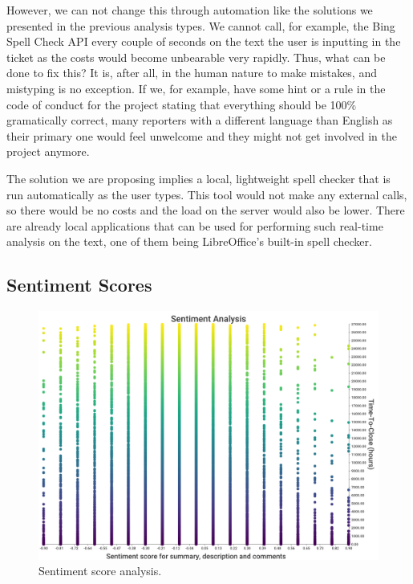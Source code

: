 \documentclass{mpaper}
\begin{document}
However, we can not change this through automation like the solutions we presented in the previous 
analysis types. We cannot call, for example, the Bing Spell Check API every couple of seconds on the text the user 
is inputting in the ticket as the costs would become unbearable very rapidly. Thus, what can be done to fix this? It is, 
after all, in the human nature to make mistakes, and mistyping is no exception. If we, for example, have some hint or a rule
in the code of conduct for the project stating that everything should be 100\% gramatically correct, many reporters with a 
different language than English as their primary one would feel unwelcome and they might not get involved in the project anymore. 

The solution we are proposing implies a local, lightweight spell checker that is run automatically as the user types. 
This tool would not make any external calls, so there would be no costs and the load on the server would also be lower. 
There are already local applications that can be used for performing such real-time analysis on the text, one of them 
being LibreOffice's built-in spell checker.

\subsection{Sentiment Scores}

\begin{figure}[ht]
  \begin{center}
    \includegraphics[scale=0.18]{images/sentiment_analysis.png}
  \end{center}
  \caption{\label{sentiment}Sentiment score analysis.}
\end{figure}
\end{document}
